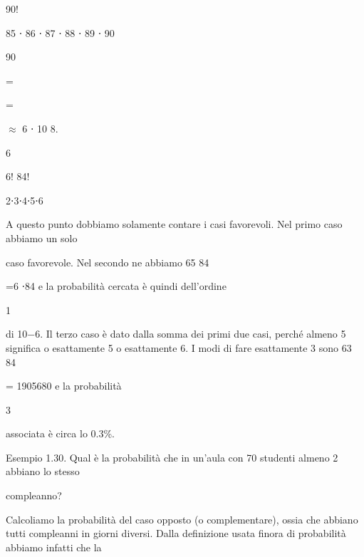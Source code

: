 \documentclass[a4paper,portrait,12pt]{article}
\begin{document}
90!


85 ⋅ 86 ⋅ 87 ⋅ 88 ⋅ 89 ⋅ 90


90


=


=


$\approx$ 6 ⋅ 10 8.


6


6! 84!


2⋅3⋅4⋅5⋅6


\begin{flushleft}
A questo punto dobbiamo solamente contare i casi favorevoli. Nel primo caso abbiamo un solo
\end{flushleft}


\begin{flushleft}
caso favorevole. Nel secondo ne abbiamo 65 84
\end{flushleft}


\begin{flushleft}
=6 ⋅84 e la probabilit\`{a} cercata \`{e} quindi dell'ordine
\end{flushleft}


1


\begin{flushleft}
di 10$-$6. Il terzo caso \`{e} dato dalla somma dei primi due casi, perch\'{e} almeno 5 significa o esattamente 5 o esattamente 6. I modi di fare esattamente 3 sono 63 84
\end{flushleft}


\begin{flushleft}
= 1905680 e la probabilit\`{a}
\end{flushleft}


3


\begin{flushleft}
associata \`{e} circa lo 0.3\%.
\end{flushleft}


\begin{flushleft}
Esempio 1.30. Qual \`{e} la probabilit\`{a} che in un'aula con 70 studenti almeno 2 abbiano lo stesso
\end{flushleft}


\begin{flushleft}
compleanno?
\end{flushleft}


\begin{flushleft}
Calcoliamo la probabilit\`{a} del caso opposto (o complementare), ossia che abbiano tutti compleanni in giorni diversi. Dalla definizione usata finora di probabilit\`{a} abbiamo infatti che la
\end{flushleft}
\end{document}
